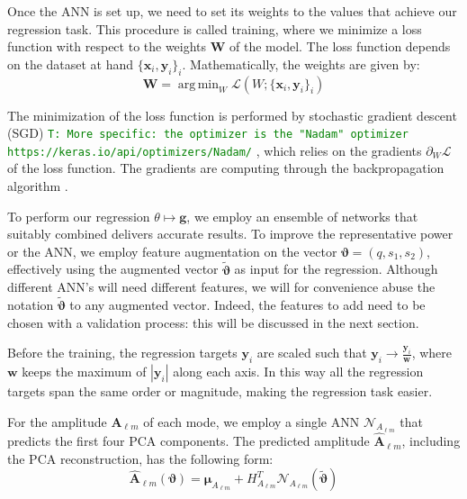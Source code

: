 \documentclass[twocolumn,showpacs,preprintnumbers,nofootinbib,prd,
superscriptaddress,10pt]{revtex4-1}
\DeclareMathOperator*{\argmin}{arg\,min}
\newcommand{\tim}[1]{{\textcolor{green}{\texttt{T: #1}} }}
\begin{document}
Once the ANN is set up, we need to set its weights to the values that achieve our regression task.
This procedure is called training, where we minimize a loss function with respect to the weights $\boldsymbol{W}$ of the model.
The loss function depends on the dataset at hand ${\{\boldsymbol{x}_i, \boldsymbol{y}_i\}_i}$.
Mathematically, the weights are given by:
%
\begin{equation}\label{eq:loss_general}
	\boldsymbol{W} = \argmin_W \mathcal{L}(W; \{\boldsymbol{x}_i, \boldsymbol{y}_i\}_i)
\end{equation}

The minimization of the loss function is performed by stochastic gradient descent (SGD) \tim{More specific: the optimizer is the "Nadam" optimizer https://keras.io/api/optimizers/Nadam/}, which relies on the gradients $\partial_W \mathcal{L}$ of the loss function. The gradients are computing through the backpropagation algorithm \cite{}.

To perform our regression $\theta \longmapsto \boldsymbol{g}$, we employ an ensemble of networks that suitably combined delivers accurate results.
To improve the representative power or the ANN, we employ feature augmentation on the vector $\boldsymbol{\vartheta} = (q, s_1, s_2)$, effectively using the augmented vector $\tilde{\boldsymbol{\vartheta}}$ as input for the regression. Although different ANN's will need different features, we will for convenience abuse the notation $\tilde{\boldsymbol{\vartheta}}$ to any augmented vector. Indeed, the features to add need to be chosen with a validation process: this will be discussed in the next section.

Before the training, the regression targets $\boldsymbol{y}_i$ are scaled such that $\boldsymbol{y}_i \rightarrow \frac{\boldsymbol{y}_i}{\boldsymbol{w}}$, where $\boldsymbol{w}$ keeps the maximum of $|\boldsymbol{y}_i|$ along each axis. %
In this way all the regression targets span the same order or magnitude, making the regression task easier.

For the amplitude $\boldsymbol{A}_{\ell m}$ of each mode, we employ a single ANN $\mathcal{N}_{A_{\ell m}}$ that predicts the first four PCA components.
The predicted amplitude $\hat{\boldsymbol{A}}_{\ell m}$, including the PCA reconstruction, has the following form:
\begin{equation}\label{eq:amp_pred}
	\hat{\boldsymbol{A}}_{\ell m}(\boldsymbol{\vartheta}) = \boldsymbol{\mu}_{A_{\ell m}} + H_{A_{\ell m}}^T \mathcal{N}_{A_{\ell m}}(\tilde{\boldsymbol{\vartheta}})
\end{equation}
\end{document}
